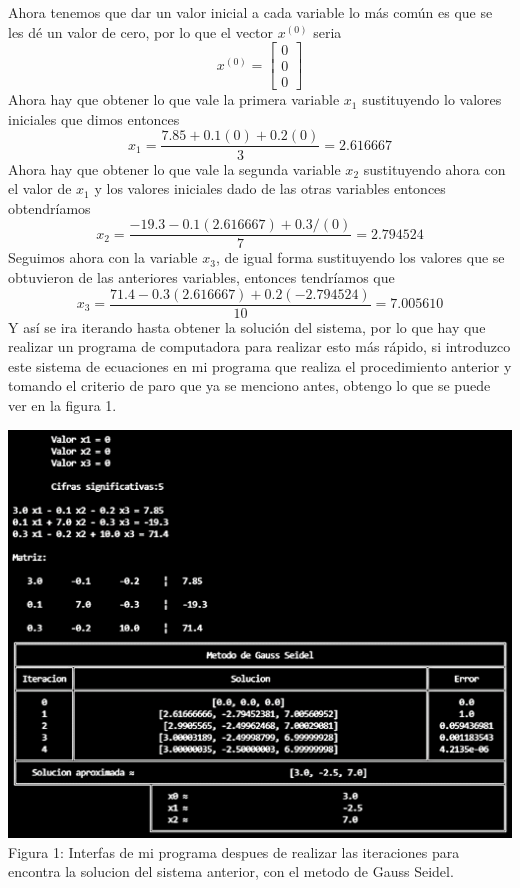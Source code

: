 \documentclass[12pt]{article}
\begin{document}
			Ahora tenemos que dar un valor inicial a cada variable lo más común es que se les dé un valor de cero, por lo que 
			el vector $ x^{(0)} $ seria
			$$
			x^{(0)} =
			\left[\begin{array}{c}
				0 \\
				0 \\
				0 
			\end{array}\right]
			$$
			Ahora hay que obtener lo que vale la primera variable $ x_1 $ sustituyendo lo valores iniciales que dimos entonces
			$$ x_1 = \frac{7.85 + 0.1(0) + 0.2(0)}{3} = 2.616667 $$
			Ahora hay que obtener lo que vale la segunda variable $ x_2 $ sustituyendo ahora con el valor de $ x_1 $ y los valores 
			iniciales dado de las otras variables entonces obtendríamos
			$$ x_2 = \frac{-19.3 - 0.1(2.616667) + 0.3/(0)}{7} = 2.794524 $$
			Seguimos ahora con la variable $ x_3 $, de igual forma sustituyendo los valores que se obtuvieron de las anteriores 
			variables, entonces tendríamos que
			$$ x_3 = \frac{71.4 - 0.3(2.616667) + 0.2(-2.794524)}{10} = 7.005610 $$
			Y así se ira iterando hasta obtener la solución del sistema, por lo que hay que realizar un programa de computadora para 
			realizar esto más rápido, si introduzco este sistema de ecuaciones en mi programa que realiza el procedimiento anterior y 
			tomando el criterio de paro que ya se menciono antes, obtengo lo que se puede ver en la figura 1.
			\begin{center}
				\includegraphics[width=\linewidth]{Figura 1.png}
				Figura 1: Interfas de mi programa despues de realizar las iteraciones para encontra la solucion del sistema anterior, con el metodo de Gauss Seidel.
			\end{center}
\end{document}
